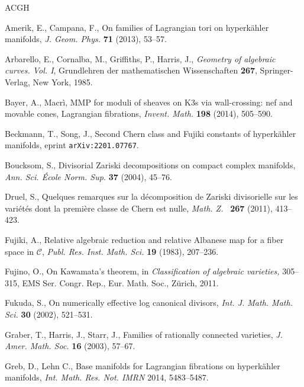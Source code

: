 \documentclass[12pt]{amsart}
\def\cC{\mathscr{C}}
\theoremstyle{remark}
\begin{document}
\begin{thebibliography}{ACGH}



 Amerik, E., Campana, F.,
On families of Lagrangian tori on hyperk\"ahler manifolds, {\em J. Geom. Phys.} {\bf71} (2013), 53--57.

 Arbarello, E., Cornalba, M., Griffiths, P., Harris, J., \emph{Geometry of algebraic curves. Vol. I}, Grundlehren der mathematischen Wissenschaften {\bf 267}, Springer-Verlag, New York, 1985.



 Bayer, A., Macr\`i,  MMP for moduli of sheaves on K3s via wall-crossing: nef and movable cones, Lagrangian fibrations, {\it Invent. Math.}  {\bf 198} (2014), 505--590.

 Beckmann, T., Song, J., Second Chern class and Fujiki constants of hyperk\"ahler manifolds, eprint {\tt arXiv:2201.07767}.

 Boucksom, S., Divisorial Zariski decompositions on compact complex manifolds, {\em Ann. Sci. \'Ecole Norm. Sup.} {\bf37} (2004),  45--76.



 Druel, S., Quelques remarques sur la d\'ecomposition de Zariski divisorielle sur les vari\'et\'es dont la
premi\`ere classe de Chern est nulle, {\em Math. Z.}  {\bf267} (2011),  413--423.



 Fujiki, A., Relative algebraic reduction and relative Albanese map for a fiber space in $\cC$, {\it Publ. Res. Inst. Math. Sci.} {\bf 19} (1983), 207--236.

 Fujino, O., On Kawamata's theorem, in {\it Classification of algebraic varieties,} 305--315, EMS Ser. Congr. Rep., Eur. Math. Soc., Z\"urich, 2011.

 Fukuda, S., On numerically effective log canonical divisors, {\it Int. J. Math. Math. Sci.} {\bf 30} (2002), 521--531.



 Graber, T.,  Harris, J., Starr, J., Families of rationally connected varieties, {\em  J. Amer. Math. Soc.}  {\bf16} (2003),   57--67.

 Greb, D., Lehn C., Base manifolds for Lagrangian fibrations on hyperk\"ahler manifolds, {\em Int. Math. Res. Not. IMRN} 2014, 5483--5487.


\end{thebibliography}
\end{document}
